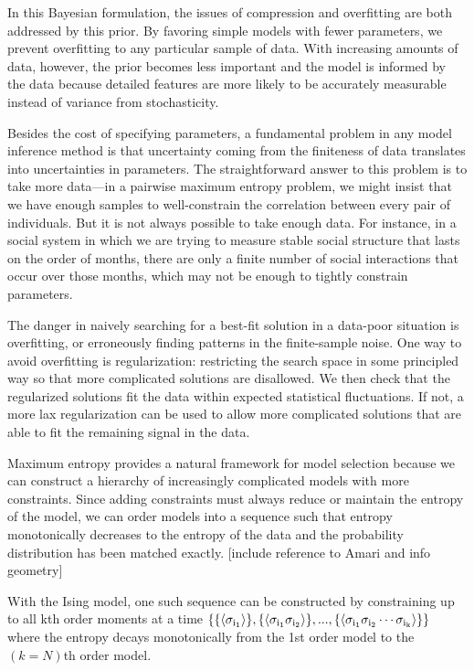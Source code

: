 \documentclass[aps,prl,twocolumn]{revtex4-1}
\begin{document}
In this Bayesian formulation, the issues of compression and overfitting are both addressed by this prior. By favoring simple models with fewer parameters, we prevent overfitting to any particular sample of data. With increasing amounts of data, however, the prior becomes less important and the model is informed by the data because detailed features are more likely to be accurately measurable instead of variance from stochasticity.

Besides the cost of specifying parameters,
a fundamental problem in any model inference method is that uncertainty coming
from the finiteness of data translates into uncertainties in parameters.
The straightforward answer to this problem is to take more data---in a pairwise
maximum entropy problem, we might insist that we have enough samples to well-constrain
the correlation between every pair of individuals.  But it is not always possible
to take enough data.  For instance, in a social system in which we are trying to
measure stable social structure that lasts on the order of months, there are only
a finite number of social interactions that occur over those months, which may
not be enough to tightly constrain parameters.

The danger in naively searching for a best-fit solution in a data-poor situation
is overfitting, or erroneously finding patterns in the finite-sample noise.
One way to avoid overfitting is regularization:
restricting the search space in some principled way so that more complicated
solutions are disallowed.  We then check that the regularized solutions fit the
data within expected statistical fluctuations.  If not, a more lax regularization
can be used to allow more complicated solutions that are able to fit the
remaining signal in the data.

Maximum entropy provides a natural framework for model selection because we can construct a hierarchy of increasingly complicated models with more constraints. Since adding constraints must always reduce or maintain the entropy of the model, we can order models into a sequence such that entropy monotonically decreases to the entropy of the data and the probability distribution has been matched exactly. [include reference to Amari and info geometry]

With the Ising model, one such sequence can be constructed by constraining up to all kth order moments at a time $\left\{ \{\left<\sigma_{\rm i_1}\right>\},\{\left<\sigma_{\rm i_1}\sigma_{\rm i_2}\right>\},...,\{\left<\sigma_{\rm i_1}\sigma_{\rm i_2}\cdots\sigma_{\rm i_k}\right>\}\right\}$ where the entropy decays monotonically from the 1st order model to the $(k=N)$th order model. 
\end{document}
